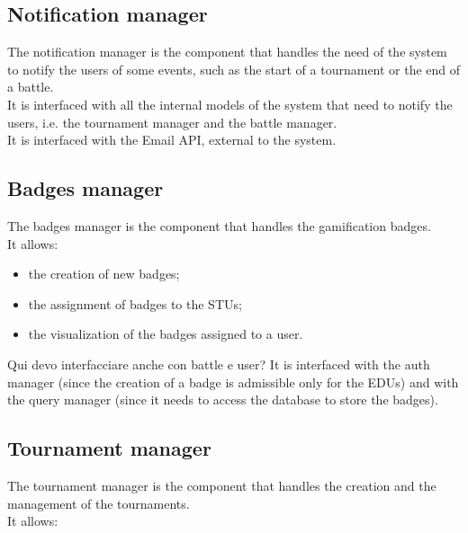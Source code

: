 \subsection*{Notification manager}
The notification manager is the component that handles the need of the system to notify the users of some events, such as the start of a tournament or the end of a battle.\\
It is interfaced with all the internal models of the system that need to notify the users, i.e. the tournament manager and the battle manager.\\
It is interfaced with the Email API, external to the system.\\

\subsection*{Badges manager}
The badges manager is the component that handles the gamification badges.\\
It allows:
\begin{itemize}
    \item the creation of new badges;
    \item the assignment of badges to the STUs;
    \item the visualization of the badges assigned to a user.
\end{itemize}
{\color{red}Qui devo interfacciare anche con battle e user?}
It is interfaced with the auth manager (since the creation of a badge is admissible only for the EDUs) and with the query manager (since it needs to access the database to store the badges).\\

\subsection*{Tournament manager}
The tournament manager is the component that handles the creation and the management of the tournaments.\\
It allows: